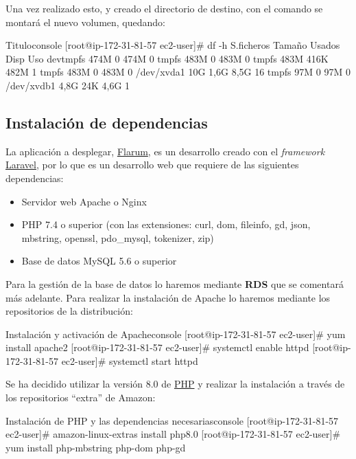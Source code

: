 \documentclass{\ClassPath/viu-tfm-template}
\begin{document}
Una vez realizado esto, y creado el directorio de destino, con el comando  se montará el nuevo volumen, quedando:

\begin{mycode}{Titulo}{console}{}
[root@ip-172-31-81-57 ec2-user]# df -h
S.ficheros     Tamaño Usados  Disp Uso%
devtmpfs         474M      0  474M   0%
tmpfs            483M      0  483M   0%
tmpfs            483M   416K  482M   1%
tmpfs            483M      0  483M   0%
/dev/xvda1        10G   1,6G  8,5G  16%
tmpfs             97M      0   97M   0%
/dev/xvdb1       4,8G    24K  4,6G   1%
\end{mycode}


\subsection{Instalación de dependencias}
La aplicación a desplegar, \href{https://flarum.org/}{Flarum}, es un desarrollo creado con el \textit{framework} \href{https://laravel.com/}{Laravel}, por lo que es un desarrollo web que requiere de las siguientes dependencias:

\begin{itemize}
    \item Servidor web Apache o Nginx
    \item PHP 7.4 o superior (con las extensiones: curl, dom, fileinfo, gd, json, mbstring, openssl, pdo\_mysql, tokenizer, zip)
    \item Base de datos MySQL 5.6 o superior
\end{itemize}

Para la gestión de la base de datos lo haremos mediante \textbf{RDS} que se comentará más adelante. Para realizar la instalación de Apache lo haremos mediante los repositorios de la distribución:

\begin{mycode}{Instalación y activación de Apache}{console}{}
[root@ip-172-31-81-57 ec2-user]# yum install apache2
[root@ip-172-31-81-57 ec2-user]# systemctl enable httpd
[root@ip-172-31-81-57 ec2-user]# systemctl start httpd
\end{mycode}

Se ha decidido utilizar la versión 8.0 de \href{https://www.php.net/}{PHP} y realizar la instalación a través de los repositorios “extra” de Amazon:

\begin{mycode}{Instalación de PHP y las dependencias necesarias}{console}{{\small }}
[root@ip-172-31-81-57 ec2-user]# amazon-linux-extras install php8.0
[root@ip-172-31-81-57 ec2-user]# yum install php-mbstring php-dom php-gd
\end{mycode}
\end{document}
